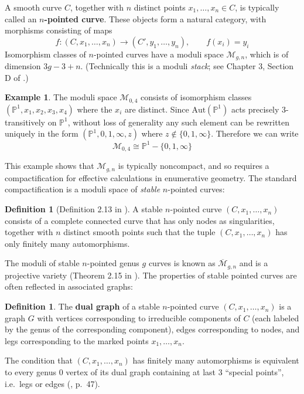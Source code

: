 \documentclass[11pt]{article}           %
\newcommand{\Aut}{\text{Aut}}
\renewcommand{\P}{\mathbb P}
\theoremstyle{definition}
\newtheorem{dfn}[thm]{Definition}
\newtheorem{eg}[thm]{Example}
\begin{document}
A smooth curve $C$, together with $n$ distinct
points $x_1,\dots,x_n\in C$, is typically called an {\bf $n$-pointed curve}.
These objects form a natural category, with morphisms
consisting of maps
\[
f:(C,x_1,\dots,x_n)\to (C',y_1,\dots,y_n),\qquad f(x_i)=y_i
\]
Isomorphism classes of $n$-pointed curves have a moduli space
$\mathcal M_{g,n}$, which is of dimension $3g-3+n$.
(Technically this is a moduli {\it stack}; see Chapter 3, Section D of
\cite{Moduli}.)

\begin{eg}
  The moduli space $\mathcal M_{0,4}$ consists of isomorphism classes
  $(\P^1,x_1,x_2,x_3,x_4)$ where the $x_i$ are distinct.
  Since $\Aut(\P^1)$ acts precisely $3$-transitively on $\P^1$,
  without loss of generality any such element can be rewritten uniquely
  in the form $(\P^1,0,1,\infty,z)$ where $z\notin\{0,1,\infty\}$.
  Therefore we can write
  \[
  \mathcal M_{0,4}\cong\P^1-\{0,1,\infty\}
  \]
\end{eg}

This example shows that $\mathcal M_{g,n}$ is typically noncompact,
and so requires a compactification for effective calculations in
enumerative geometry. The standard compactification is a moduli
space of {\it stable} $n$-pointed curves:

\begin{dfn}[Definition 2.13 in \cite{Moduli}]
  A stable $n$-pointed curve $(C,x_1,\dots,x_n)$ consists of
  a complete connected curve that has only nodes as singularities, together
  with $n$ distinct smooth points such that the tuple $(C,x_1,\dots,x_n)$
  has only finitely many automorphisms.
\end{dfn}

The moduli of stable $n$-pointed genus $g$ curves is known as $\overline{\mathcal M}_{g,n}$ and is a projective variety (Theorem 2.15 in \cite{Moduli}).
The properties of stable pointed curves are often reflected in associated graphs:

\begin{dfn}
  The {\bf dual graph} of a stable $n$-pointed curve $(C,x_1,\dots,x_n)$
  is a graph $G$ with vertices corresponding to irreducible components
  of $C$ (each labeled by the genus of
  the corresponding component), edges corresponding to nodes, and
  legs corresponding to the marked points $x_1,\dots,x_n$.
\end{dfn}

The condition that $(C,x_1,\dots,x_n)$ has finitely many
automorphisms is equivalent to every genus $0$ vertex of its dual graph
containing at last 3 ``special points'', i.e.\ legs or edges (\cite{Moduli}, p.\ 47).
\end{document}

